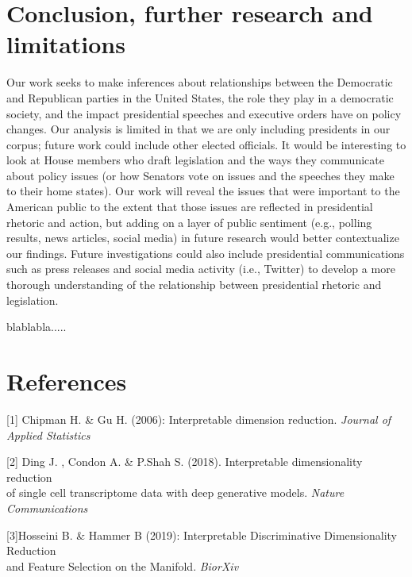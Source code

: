 \documentclass{article}
\begin{document}
\section{Conclusion, further research and limitations}{
Our work seeks to make inferences about relationships between the Democratic and Republican parties in the United States, the role they play in a democratic society, and the impact presidential speeches and executive orders have on policy changes. Our analysis is limited in that we are only including presidents in our corpus; future work could include other elected officials. It would be interesting to look at House members who draft legislation and the ways they communicate about policy issues (or how Senators vote on issues and the speeches they make to their home states). Our work will reveal the issues that were important to the American public to the extent that those issues are reflected in presidential rhetoric and action, but adding on a layer of public sentiment (e.g., polling results, news articles, social media) in future research would better contextualize our findings. Future investigations could also include presidential communications such as press releases and social media activity (i.e., Twitter) to develop a more thorough understanding of the relationship between presidential rhetoric and legislation.

blablabla.....
}

\section{References}\label{sec_ref}

[1] Chipman H. \& Gu H. (2006): Interpretable dimension reduction. 
{\it Journal of Applied Statistics}

[2] Ding J. , Condon A. \& P.Shah S. (2018). Interpretable dimensionality reduction \\ of single cell transcriptome data with deep generative models. 
{\it Nature Communications}

[3]Hosseini B. \& Hammer B (2019): Interpretable Discriminative Dimensionality Reduction \\ and Feature Selection on the Manifold.
{\it BiorXiv}
\end{document}
